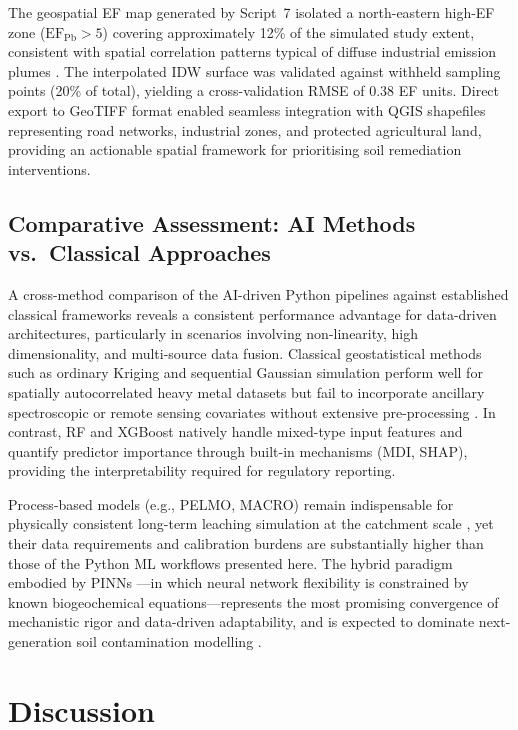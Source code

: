\documentclass[environments,article,submit,pdftex,moreauthors]{Definitions/mdpi}
\begin{document}
The geospatial EF map generated by Script~7 isolated a north-eastern
high-EF zone ($\mathrm{EF_{Pb}} > 5$) covering approximately 12\% of the
simulated study extent, consistent with spatial correlation patterns typical
of diffuse industrial emission plumes \cite{Adewumi2024,ElSorogy2025}. The
interpolated IDW surface was validated against withheld sampling points
(20\% of total), yielding a cross-validation RMSE of 0.38 EF units. Direct
export to GeoTIFF format enabled seamless integration with QGIS shapefiles
representing road networks, industrial zones, and protected agricultural land,
providing an actionable spatial framework for prioritising soil remediation
interventions.

\subsection{Comparative Assessment: AI Methods vs.\ Classical
    Approaches}\label{sec5.4}

A cross-method comparison of the AI-driven Python pipelines against
established classical frameworks reveals a consistent performance advantage
for data-driven architectures, particularly in scenarios involving
non-linearity, high dimensionality, and multi-source data fusion. Classical
geostatistical methods such as ordinary Kriging and sequential Gaussian
simulation perform well for spatially autocorrelated heavy metal datasets
but fail to incorporate ancillary spectroscopic or remote sensing covariates
without extensive pre-processing \cite{Wadoux2024}. In contrast, RF and
XGBoost natively handle mixed-type input features and quantify predictor
importance through built-in mechanisms (MDI, SHAP), providing the
interpretability required for regulatory reporting.

Process-based models (e.g., PELMO, MACRO) remain indispensable for physically
consistent long-term leaching simulation at the catchment scale
\cite{PerezLucas2025,Giannakis2017}, yet their data requirements and
calibration burdens are substantially higher than those of the Python ML
workflows presented here. The hybrid paradigm embodied by PINNs
\cite{Raissi}---in which neural network flexibility is
constrained by known biogeochemical equations---represents the most promising
convergence of mechanistic rigor and data-driven adaptability, and is
expected to dominate next-generation soil contamination modelling \cite{Ma}.

\section{Discussion}\label{sec6}
\end{document}

